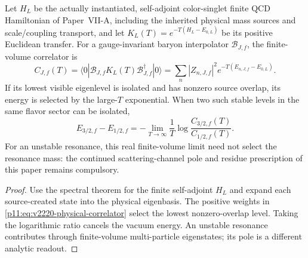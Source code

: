 \documentclass[12pt,a4paper]{article}
\begin{document}
\begin{proposition}
\label{p11:prop:v2220-physical-baryon-readout}
Let $H_L$ be the actually instantiated, self-adjoint color-singlet
finite QCD Hamiltonian of Paper~VII-A, including the inherited physical
mass sources and scale/coupling transport, and let
$K_L(T)=e^{-T(H_L-E_{0,L})}$ be its positive Euclidean transfer.
For a gauge-invariant baryon interpolator $\mathcal B_{J,f}$, the
finite-volume correlator is
\begin{equation}
\label{p11:eq:v2220-physical-correlator}
 C_{J,f}(T)=\langle0|\mathcal B_{J,f}K_L(T)
 \mathcal B_{J,f}^{\dagger}|0\rangle
 =\sum_n |Z_{n,J,f}|^2e^{-T(E_{n,J,f}-E_{0,L})}.
\end{equation}
If its lowest visible eigenlevel is isolated and has nonzero source
overlap, its energy is selected by the large-$T$ exponential.
When two such stable levels in the same flavor sector can be isolated,
\begin{equation}
\label{p11:eq:v2220-stable-hyperfine}
 E_{3/2,f}-E_{1/2,f}
 =-\lim_{T\to\infty}\frac1T
 \log\!\frac{C_{3/2,f}(T)}{C_{1/2,f}(T)}.
\end{equation}
For an unstable resonance, this real finite-volume limit need not
select the resonance mass: the continued scattering-channel pole and
residue prescription of this paper remains compulsory.
\end{proposition}
\begin{proof}
Use the spectral theorem for the finite self-adjoint $H_L$ and expand
each source-created state into the physical eigenbasis.  The positive
weights in \eqref{p11:eq:v2220-physical-correlator} select the lowest
nonzero-overlap level.  Taking the logarithmic ratio cancels the vacuum
energy.  An unstable resonance contributes through finite-volume
multi-particle eigenstates; its pole is a different analytic readout.
\end{proof}
\end{document}
